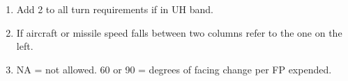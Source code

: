 \begin{twocolumntablefloat}
\begin{twocolumntable}
\begin{tablenote}{0.9\linewidth}
\begin{enumerate}[nosep]
    \item Add 2 to all turn requirements if in UH band.
    \item If aircraft or missile speed falls between two columns refer to the one on the left.
    \item NA = not allowed. 60 or 90 = degrees of facing change per FP expended.
\end{enumerate}
\end{tablenote}

\end{twocolumntable}
\end{twocolumntablefloat}
